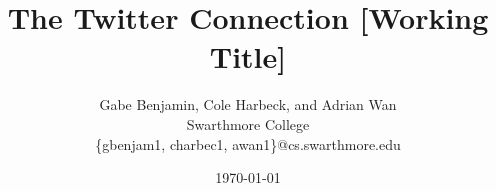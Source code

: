 \documentclass{sig-alternate}
\begin{document}
\date{\today}

\title{The Twitter Connection [Working Title]}

\author{
    Gabe Benjamin, Cole Harbeck, and Adrian Wan\\
    Swarthmore College\\
    \{gbenjam1, charbec1, awan1\}@cs.swarthmore.edu
}

\maketitle


% 
% 
% 
% 
% 
% 
% 


\balance
\end{document}
